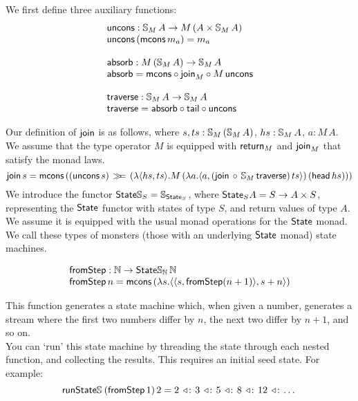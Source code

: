 We first define three auxiliary functions:
$$
\begin{array}{l}
\mathsf{uncons} : \mathbb{S}_{M}\,A \rightarrow M\,(A \times \mathbb{S}_{M}\,A)\\
\mathsf{uncons}\, (\mathsf{mcons}\, m_a) = m_a \\
\,\\
\mathsf{absorb} : M\,(\mathbb{S}_{M}\,A) \rightarrow \mathbb{S}_{M}\,A \\
\mathsf{absorb} =  \mathsf{mcons} \circ \mathsf{join}_{M} \circ M\,\mathsf{uncons} \\
\,\\
\mathsf{traverse} : \mathbb{S}_{M}\,A \rightarrow \mathbb{S}_{M}\,A \\
\mathsf{traverse} = \mathsf{absorb} \circ \mathsf{tail} \circ \mathsf{uncons}
\end{array}
$$

Our definition of $\mathsf{join}$ is as follows, where $s, ts : \mathbb{S}_{M}\,(\mathbb{S}_{M}\, A)$, 
$hs : \mathbb{S}_{M}\, A$, $a : M\, A$. We assume that the type operator $M$ is equipped with $\mathsf{return}_M$ and $\mathsf{join}_M$ that satisfy the monad laws.
$$
\mathsf{join}\, s = \mathsf{mcons}\, ((\mathsf{uncons}\, s) \, \mathbin{\gg\!\!=} \,(\lambda \langle hs, ts \rangle . M\,(\lambda a . \langle a, (\mathsf{join}\, \circ\, \mathbb{S}_{M}\,\mathsf{traverse})\, ts \rangle)\, (\mathsf{head}\, hs)))
$$
We introduce the functor $\mathsf{State}\mathbb{S}_{S} = \mathbb{S}_{\mathsf{State}_S}$, where $\mathsf{State}_S A = S \rightarrow A \times S$, representing the $\mathsf{State}$ functor with states of type $S$, and return values of type $A$. We assume it is equipped with the usual monad operations for the $\mathsf{State}$ monad. We call these types of monsters (those with an underlying $\mathsf{State}$ monad) state machines.

$$
\begin{array}{l}
\mathsf{fromStep} : \mathbb{N} \rightarrow \mathsf{State}\mathbb{S}_{\mathbb{N}}\,\mathbb{N} \\
\mathsf{fromStep}\, n = \mathsf{mcons}\, (\lambda s. \langle \langle s, \mathsf{fromStep} (n + 1) \rangle, s + n \rangle)
\end{array}
$$

This function generates a state machine which, when given a number, generates a stream where the first two numbers differ by $n$, the next two differ by $n + 1$, and so on. \\
You can `run' this state machine by threading the state through each nested function, and collecting the results. This requires an initial seed state. For example:
$$
\mathsf{run}\mathsf{State}\mathbb{S}_{}\,(\mathsf{fromStep}\, 1)\, 2 = 2\, \mathbin{\triangleleft\!:}\, 3\, \mathbin{\triangleleft\!:}\, 5\, \mathbin{\triangleleft\!:}\, 8\, \mathbin{\triangleleft\!:}\, 12\, \mathbin{\triangleleft\!:}\, \dots
$$\\

